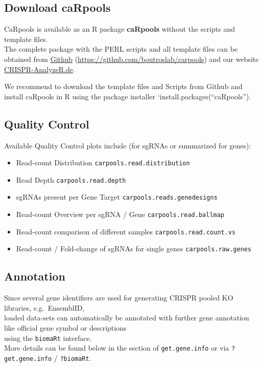 \documentclass[]{article}
\providecommand{\tightlist}{%
  \setlength{\itemsep}{0pt}\setlength{\parskip}{0pt}}
\begin{document}
\newpage

\subsection{Download caRpools}\label{download-carpools}

CaRpools is available as an R package \textbf{caRpools} without the
scripts and template files.\\
The complete package with the PERL scripts and all template files can be
obtained from \href{https://github.com/boutroslab/carpools}{Github}
(\url{https://github.com/boutroslab/carpools}) and our website
\href{http://www.crispr-analyzer.de}{CRISPR-AnalyzeR.de}.

We recommend to download the template files and Scripts from Github and
install caRpools in R using the package installer
`install.packages(``caRpools'').

\subsection{Quality Control}\label{quality-control}

Available Quality Control plots include (for sgRNAs or summarized for
genes):

\begin{itemize}
\tightlist
\item
  Read-count Distribution \texttt{carpools.read.distribution}
\item
  Read Depth \texttt{carpools.read.depth}
\item
  sgRNAs present per Gene Target \texttt{carpools.reads.genedesigns}
\item
  Read-count Overview per sgRNA / Gene \texttt{carpools.read.ballmap}
\item
  Read-count comparison of different samples
  \texttt{carpools.read.count.vs}
\item
  Read-count / Fold-change of sgRNAs for single genes
  \texttt{carpools.raw.genes}
\end{itemize}

\subsection{Annotation}\label{annotation}

Since several gene identifiers are used for generating CRISPR pooled KO
libraries, e.g.~EnsemblID,\\
loaded data-sets can automatically be annotated with further gene
annotation like official gene symbol or descriptions\\
using the \texttt{biomaRt} interface.\\
More details can be found below in the section of \texttt{get.gene.info}
or via \texttt{?get.gene.info} / \texttt{?biomaRt}.
\end{document}
